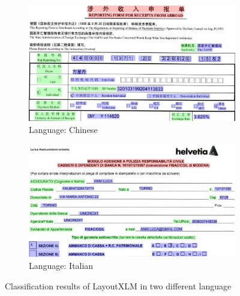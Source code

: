 \begin{figure}[!ht]
    \begin{subfigure}{\textwidth}
    \centering
    \includegraphics[scale=0.3]{chapters/images/Literature_review/LayoutXLM_Results_Chinese.JPG}
    \caption{Language: Chinese}
    \label{subfig:a}
    \end{subfigure}
    \begin{subfigure}{\textwidth}
    \centering
    \includegraphics[scale=0.3]{chapters/images/Literature_review/LayoutXLM_Results_Italian.JPG}
    \caption{Language: Italian}
    \label{subfig:b}
    \end{subfigure}
    \caption{Classification results of LayoutXLM in two different language \cite{xu2021layoutxlm}}\label{fig:result_of_LayoutXLM}
\end{figure}








